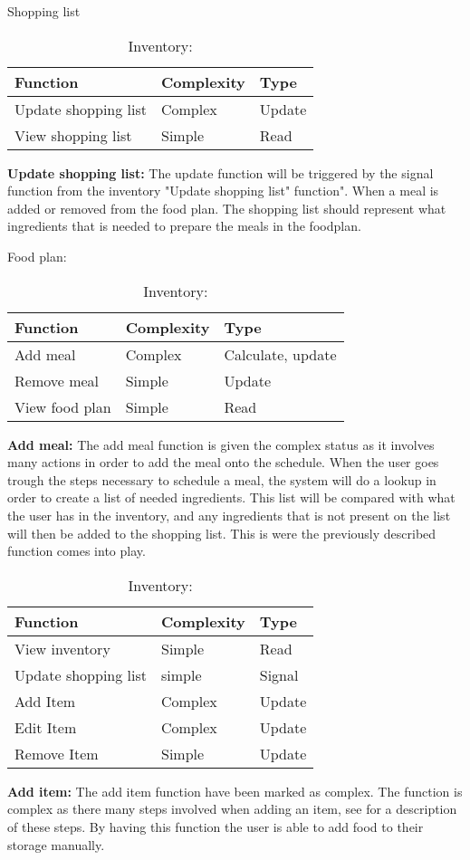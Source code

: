 \begin{table}[H]
	\centering
	\caption{Shopping list}
	\begin{tabular}{|l|l|l|}\hline
		\textbf{Function}&\textbf{Complexity}&\textbf{Type}\\\hline
	  Update shopping list  &  Complex & Update \\\hline
	  View shopping list    &  Simple  & Read   \\\hline
  \end{tabular}
  \begin{flushleft}
    \textbf{Update shopping list:} The update function will be triggered by the signal function from the inventory "Update shopping list" function". When a meal is added or removed from the food plan. The shopping list should represent what ingredients that is needed to prepare the meals in the foodplan.
  \end{flushleft}
	\caption{Food plan:}
  \begin{tabular}{|l|l|l|}\hline
		\textbf{Function}&\textbf{Complexity}&\textbf{Type}\\\hline
	  Add meal              &  Complex & Calculate, update \\\hline
	  Remove meal           &  Simple  & Update            \\\hline
	  View food plan        &  Simple  & Read              \\\hline
  \end{tabular}
  \begin{flushleft}
    \textbf{Add meal:} The add meal function is given the complex status as it involves many actions in order to add the meal onto the schedule. When the user goes trough the steps necessary to schedule a meal, the system will do a lookup in order to create a list of needed ingredients. This list will be compared with what the user has in the inventory, and any ingredients that is not present on the list will then be added to the shopping list. This is were the previously described function comes into play.
  \end{flushleft}
	\caption{Inventory:}
  \begin{tabular}{|l|l|l|}\hline
		\textbf{Function}&\textbf{Complexity}&\textbf{Type}\\\hline
	  View inventory        &  Simple  & Read   \\\hline
	  Update shopping list  &  simple  & Signal \\\hline
	  Add Item              &  Complex & Update \\\hline
	  Edit Item             &  Complex & Update \\\hline
	  Remove Item           &  Simple  & Update \\\hline
  \end{tabular}
  \begin{flushleft}  	  
    \textbf{Add item:} The add item function have been marked as complex. The function is complex as there many steps involved when adding an item, see  for a description of these steps. By having this function the user is able to add food to their storage manually.
    

\end{flushleft}
\end{table}
